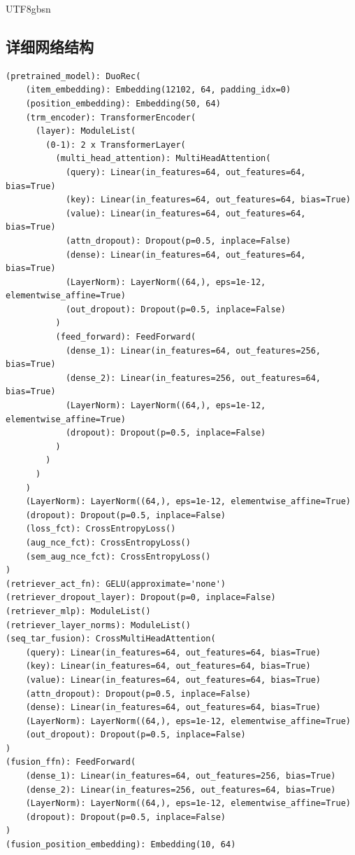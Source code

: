 \documentclass[12pt,a4paper]{article}
\begin{document}
\begin{CJK}{UTF8}{gbsn}
\subsection{详细网络结构}
\begin{verbatim}
(pretrained_model): DuoRec(
    (item_embedding): Embedding(12102, 64, padding_idx=0)
    (position_embedding): Embedding(50, 64)
    (trm_encoder): TransformerEncoder(
      (layer): ModuleList(
        (0-1): 2 x TransformerLayer(
          (multi_head_attention): MultiHeadAttention(
            (query): Linear(in_features=64, out_features=64, bias=True)
            (key): Linear(in_features=64, out_features=64, bias=True)
            (value): Linear(in_features=64, out_features=64, bias=True)
            (attn_dropout): Dropout(p=0.5, inplace=False)
            (dense): Linear(in_features=64, out_features=64, bias=True)
            (LayerNorm): LayerNorm((64,), eps=1e-12, elementwise_affine=True)
            (out_dropout): Dropout(p=0.5, inplace=False)
          )
          (feed_forward): FeedForward(
            (dense_1): Linear(in_features=64, out_features=256, bias=True)
            (dense_2): Linear(in_features=256, out_features=64, bias=True)
            (LayerNorm): LayerNorm((64,), eps=1e-12, elementwise_affine=True)
            (dropout): Dropout(p=0.5, inplace=False)
          )
        )
      )
    )
    (LayerNorm): LayerNorm((64,), eps=1e-12, elementwise_affine=True)
    (dropout): Dropout(p=0.5, inplace=False)
    (loss_fct): CrossEntropyLoss()
    (aug_nce_fct): CrossEntropyLoss()
    (sem_aug_nce_fct): CrossEntropyLoss()
)
(retriever_act_fn): GELU(approximate='none')
(retriever_dropout_layer): Dropout(p=0, inplace=False)
(retriever_mlp): ModuleList()
(retriever_layer_norms): ModuleList()
(seq_tar_fusion): CrossMultiHeadAttention(
    (query): Linear(in_features=64, out_features=64, bias=True)
    (key): Linear(in_features=64, out_features=64, bias=True)
    (value): Linear(in_features=64, out_features=64, bias=True)
    (attn_dropout): Dropout(p=0.5, inplace=False)
    (dense): Linear(in_features=64, out_features=64, bias=True)
    (LayerNorm): LayerNorm((64,), eps=1e-12, elementwise_affine=True)
    (out_dropout): Dropout(p=0.5, inplace=False)
)
(fusion_ffn): FeedForward(
    (dense_1): Linear(in_features=64, out_features=256, bias=True)
    (dense_2): Linear(in_features=256, out_features=64, bias=True)
    (LayerNorm): LayerNorm((64,), eps=1e-12, elementwise_affine=True)
    (dropout): Dropout(p=0.5, inplace=False)
)
(fusion_position_embedding): Embedding(10, 64)
\end{verbatim}


\end{CJK}
\end{document}
